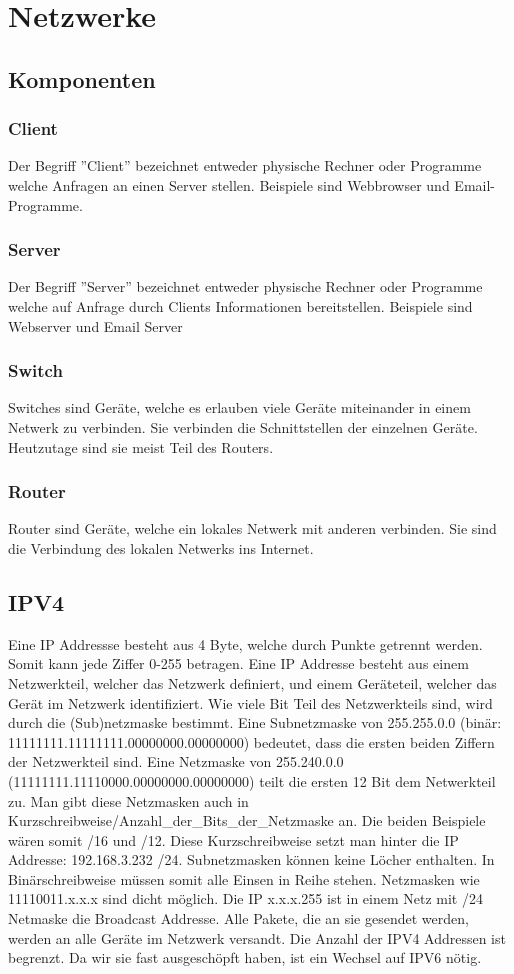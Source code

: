 \documentclass{article}
\begin{document}
\section*{Netzwerke}
\subsection*{Komponenten}
\subsubsection*{Client}
Der Begriff ''Client'' bezeichnet entweder physische Rechner oder Programme welche Anfragen an einen Server stellen.
Beispiele sind Webbrowser und Email-Programme.
\subsubsection*{Server}
Der Begriff ''Server'' bezeichnet entweder physische Rechner oder Programme welche auf Anfrage durch Clients Informationen bereitstellen.
Beispiele sind Webserver und Email Server
\subsubsection*{Switch}
Switches sind Geräte, welche es erlauben viele Geräte miteinander in einem Netwerk zu verbinden. Sie verbinden die Schnittstellen der einzelnen
Geräte. Heutzutage sind sie meist Teil des Routers.
\subsubsection*{Router}
Router sind Geräte, welche ein lokales Netwerk mit anderen verbinden. Sie sind die Verbindung des lokalen Netwerks ins Internet.

\subsection*{IPV4}
Eine IP Addressse besteht aus 4 Byte, welche durch Punkte getrennt werden. Somit kann jede Ziffer 0-255 betragen.
Eine IP Addresse besteht aus einem Netzwerkteil, welcher das Netzwerk definiert, und einem Geräteteil, welcher das
Gerät im Netzwerk identifiziert. Wie viele Bit Teil des Netzwerkteils sind, wird durch die (Sub)netzmaske bestimmt.
Eine Subnetzmaske von 255.255.0.0 (binär: 11111111.11111111.00000000.00000000) bedeutet, dass die ersten beiden Ziffern 
der Netzwerkteil sind. Eine Netzmaske von 255.240.0.0 (11111111.11110000.00000000.00000000) teilt die ersten 12 Bit dem Netwerkteil
zu. Man gibt diese Netzmasken auch in Kurzschreibweise\newline /Anzahl\_der\_Bits\_der\_Netzmaske an. Die beiden Beispiele wären somit 
/16 und /12. Diese Kurzschreibweise setzt man hinter die IP Addresse: 192.168.3.232 /24. Subnetzmasken können keine Löcher enthalten.
In Binärschreibweise müssen somit alle Einsen in Reihe stehen. Netzmasken wie 11110011.x.x.x sind dicht möglich. Die IP 
x.x.x.255 ist in einem Netz mit /24 Netmaske die Broadcast Addresse. Alle Pakete, die an sie gesendet werden, werden an alle Geräte
im Netzwerk versandt. Die Anzahl der IPV4 Addressen ist begrenzt. Da wir sie fast ausgeschöpft haben, ist ein Wechsel auf IPV6 nötig.
\end{document}

